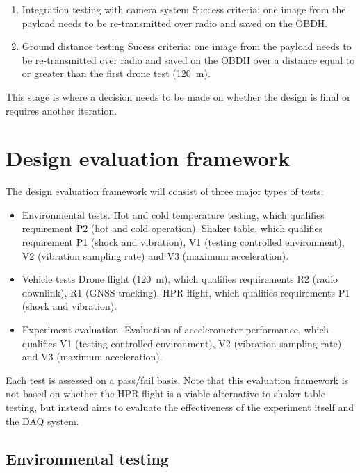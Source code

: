 \documentclass[]{report}
\begin{document}
\begin{enumerate}
  \item Integration testing with camera system %
        \subitem Success criteria: one image from the payload needs to be re-transmitted over radio and saved on the OBDH.
  \item Ground distance testing %
        \subitem Sucess criteria: one image from the payload needs to be re-transmitted over radio and saved on the OBDH over a distance equal to or greater than the first drone test (\SI{120}{\metre}).
\end{enumerate}

This stage is where a decision needs to be made on whether the design is final or requires another iteration.

\section{Design evaluation framework}

The design evaluation framework will consist of three major types of tests:

\begin{itemize}
  \item Environmental tests.
        \subitem Hot and cold temperature testing, which qualifies requirement P2 (hot and cold operation).
        \subitem Shaker table, which qualifies requirement P1 (shock and vibration), V1 (testing controlled environment), V2 (vibration sampling rate) and V3 (maximum acceleration).
  \item Vehicle tests
        \subitem Drone flight (\SI{120}{\metre}), which qualifies requirements R2 (radio downlink), R1 (GNSS tracking).
        \subitem HPR flight, which qualifies requirements P1 (shock and vibration).
  \item Experiment evaluation.
        \subitem Evaluation of accelerometer performance, which qualifies V1 (testing controlled environment), V2 (vibration sampling rate) and V3 (maximum acceleration).
\end{itemize}

Each test is assessed on a pass/fail basis. Note that this evaluation framework is not based on whether the HPR flight is a viable alternative to shaker table testing, but instead aims to evaluate the effectiveness of the experiment itself and the DAQ system.

\subsection{Environmental testing}
\end{document}
